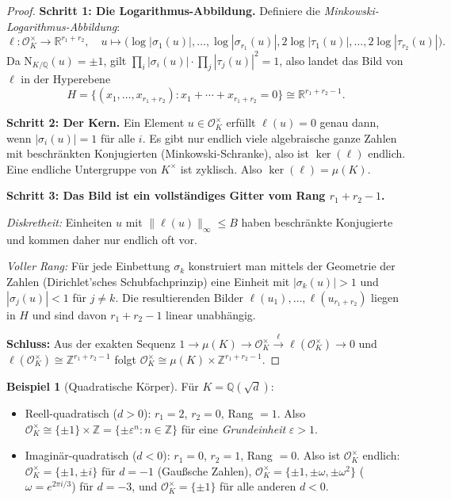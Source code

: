 \documentclass[12pt,a4paper]{amsart}
\theoremstyle{definition}
\newtheorem{example}[theorem]{Beispiel}
\newcommand{\Z}{\mathbb{Z}}
\newcommand{\Q}{\mathbb{Q}}
\newcommand{\R}{\mathbb{R}}
\newcommand{\OK}{\mathcal{O}_K}
\begin{document}
\begin{proof}
\textbf{Schritt 1: Die Logarithmus-Abbildung.}
Definiere die \emph{Minkowski-Logarithmus-Abbildung}:
\[
  \ell : \OK^\times \longrightarrow \R^{r_1+r_2},
  \quad
  u \mapsto \bigl(\log|\sigma_1(u)|, \ldots, \log|\sigma_{r_1}(u)|,
               2\log|\tau_1(u)|, \ldots, 2\log|\tau_{r_2}(u)|\bigr).
\]
Da $\mathrm{N}_{K/\Q}(u) = \pm 1$, gilt
$\prod_i |\sigma_i(u)| \cdot \prod_j |\tau_j(u)|^2 = 1$,
also landet das Bild von $\ell$ in der Hyperebene
\[
  H = \{(x_1,\ldots,x_{r_1+r_2}) : x_1 + \cdots + x_{r_1+r_2} = 0\}
  \cong \R^{r_1+r_2-1}.
\]

\textbf{Schritt 2: Der Kern.}
Ein Element $u \in \OK^\times$ erfüllt $\ell(u) = 0$ genau dann, wenn
$|\sigma_i(u)| = 1$ für alle $i$.  Es gibt nur endlich viele algebraische
ganze Zahlen mit beschränkten Konjugierten (Minkowski-Schranke), also ist
$\ker(\ell)$ endlich.  Eine endliche Untergruppe von $K^\times$ ist zyklisch.
Also $\ker(\ell) = \mu(K)$.

\textbf{Schritt 3: Das Bild ist ein vollständiges Gitter vom Rang $r_1+r_2-1$.}

\emph{Diskretheit:} Einheiten $u$ mit $\|\ell(u)\|_\infty \le B$ haben
beschränkte Konjugierte und kommen daher nur endlich oft vor.

\emph{Voller Rang:} Für jede Einbettung $\sigma_k$ konstruiert man mittels
der Geometrie der Zahlen (Dirichlet'sches Schubfachprinzip) eine Einheit
mit $|\sigma_k(u)| > 1$ und $|\sigma_j(u)| < 1$ für $j \ne k$.
Die resultierenden Bilder $\ell(u_1), \ldots, \ell(u_{r_1+r_2})$ liegen
in $H$ und sind davon $r_1+r_2-1$ linear unabhängig.

\textbf{Schluss:} Aus der exakten Sequenz
$1 \to \mu(K) \to \OK^\times \xrightarrow{\ell} \ell(\OK^\times) \to 0$
und $\ell(\OK^\times) \cong \Z^{r_1+r_2-1}$ folgt
$\OK^\times \cong \mu(K) \times \Z^{r_1+r_2-1}$.
\end{proof}

\begin{example}[Quadratische Körper]
Für $K = \Q(\sqrt{d})$:
\begin{itemize}
  \item Reell-quadratisch ($d > 0$): $r_1 = 2$, $r_2 = 0$, Rang $= 1$.
    Also $\OK^\times \cong \{\pm 1\} \times \Z = \{\pm \varepsilon^n : n \in \Z\}$
    für eine \emph{Grundeinheit} $\varepsilon > 1$.
  \item Imaginär-quadratisch ($d < 0$): $r_1 = 0$, $r_2 = 1$, Rang $= 0$.
    Also ist $\OK^\times$ endlich:
    $\OK^\times = \{\pm 1, \pm i\}$ für $d=-1$ (Gaußsche Zahlen),
    $\OK^\times = \{\pm 1, \pm\omega, \pm\omega^2\}$ ($\omega = e^{2\pi i/3}$)
    für $d=-3$, und $\OK^\times = \{\pm 1\}$ für alle anderen $d < 0$.
\end{itemize}
\end{example}
\end{document}
